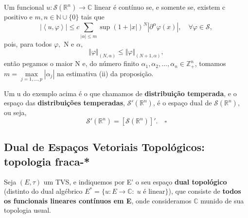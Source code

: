\documentclass[../distribution_theory_notes.tex]{subfiles}
\begin{document}
\begin{example}
	Um funcional \(u:\mathcal{S}(\mathbb{R}^{n})\rightarrow \mathbb{C}\) linear é contínuo se, e somente se, existem c positivo e \(m, n\in \mathbb{N}\cup \{0\}\) tais que
	\[
		|\left< u, \varphi  \right>|\leq c \sum\limits_{|\alpha |\leq m}^{} \sup_{}(1+|x|)^{N}|\partial^{\alpha }\varphi (x)|, \quad \forall \varphi \in \mathcal{S},
	\]
	pois, para todos \(\varphi,\) N e \(\alpha \),
	\[
		\Vert \varphi  \Vert_{(N, \alpha )}\leq \Vert \varphi  \Vert_{(N+1, \alpha )},
	\]
	então pegamos o maior N e, do número finito \(\alpha_1, \alpha_2,\dotsc ,\alpha_{n}\in \mathbb{Z}_{+}^{n}\), tomamos \(m = \max\limits_{j=1,\dotsc , p }|\alpha_{j}|\) na estimativa (ii) da proposição.
\end{example}
\begin{def*}
	Um u do exemplo acima é o que chamamos de \textbf{distribuição temperada}, e o espaço das \textbf{distribuições temperadas}, \(\mathcal{S}'(\mathbb{R}^{n} )\), é o espaço dual de \(\mathcal{S}(\mathbb{R}^{n} )\), ou seja,
	\[
		\mathcal{S}'(\mathbb{R}^{n} )=[\mathcal{S}(\mathbb{R}^{n} )]'. \quad \square
	\]
\end{def*}

\subsection{Dual de Espaços Vetoriais Topológicos: topologia fraca-*}
Seja \((E, \tau )\) um TVS, e indiquemos por E' o seu espaço \textbf{dual topológico} (distinto do dual algébrico \(E^{*}=\{u:E\rightarrow \mathbb{C}:\; u\text{ é linear}\}\)), que consiste de \textbf{todos os funcionais lineares contínuos em E}, onde consideramos \(\mathbb{C}\) munido de sua topologia usual.
\end{document}
